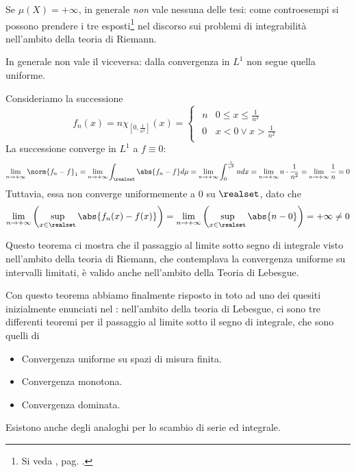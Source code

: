 \begin{attention}
	Se $\mu(X)=+\infty$, in generale \textit{non} vale nessuna delle tesi: come controesempi si possono prendere i tre esposti\footnote{Si veda , pag. \pageref{controesempipassaggiointegrale}.} nel discorso sui problemi di integrabilità nell'ambito della teoria di Riemann.
\end{attention}
In generale non vale il viceversa: dalla convergenza in $L^1$ non segue quella uniforme.
\begin{examplewt}
	Consideriamo la successione
	\begin{equation*}
		f_n(x)=n\chi_{\left[0,\frac{1}{n^2}\right]}(x)=
		\begin{cases}
			\begin{array}{ll}
				n&0\leq x\leq\frac{1}{n^2}\\
				0&x< 0\vee x>\frac{1}{n^2}
			\end{array}
		\end{cases}
	\end{equation*}
	La successione converge in $L^1$ a $f\equiv 0$:
	\begin{equation*}
		\lim_{n\to+\infty}\norm{f_n-f}_1=\lim_{n\to+\infty}\int_{\realset}\abs{f_n-f}d\mu=\lim_{n\to+\infty}\int_{0}^{\frac{1}{n^2}}ndx=\lim_{n\to+\infty}n\cdot\frac{1}{n^2}=\lim_{n\to+\infty}\frac{1}{n}=0
	\end{equation*}
	Tuttavia, essa non converge uniformemente a $0$ su $\realset$, dato che
	\begin{equation*}
		\lim_{n\to+\infty}\left(\sup_{x\in\realset}\abs{f_n(x)-f(x)}\right)=\lim_{n\to+\infty}\left(\sup_{x\in\realset}\abs{n-0}\right)=+\infty\neq 0
	\end{equation*}
\end{examplewt}
\begin{observe}
	Questo teorema ci mostra che il passaggio al limite sotto segno di integrale visto nell'ambito della teoria di Riemann, che contemplava la convergenza uniforme su intervalli limitati, è valido anche nell'ambito della Teoria di Lebesgue.
\end{observe}
Con questo teorema abbiamo finalmente risposto in toto ad uno dei quesiti inizialmente enunciati nel : nell'ambito della teoria di Lebesgue, ci sono tre differenti teoremi per il passaggio al limite sotto il segno di integrale, che sono quelli di
\begin{itemize}
	\item Convergenza uniforme su spazi di misura finita.
	\item Convergenza monotona.
	\item Convergenza dominata.
\end{itemize}
Esistono anche degli analoghi per lo scambio di serie ed integrale.
